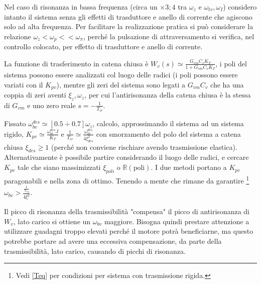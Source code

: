 Nel caso di risonanza in bassa frequenza (circa un \(\times 3;4\) tra \(\omega_z\) e \(\omega_{tv}, \omega_I\)) considero intanto il sistema senza gli effetti di trasduttore e anello di corrente che agiscono solo ad alta frequenza.
Per facilitare la realizzazione pratica si può considerare la relazione \(\omega_z < \omega_p << \omega_\pi\), perché la pulsazione di attraversamento si verifica, nel controllo colocato, per effetto di trasduttore e anello di corrente.

La funzione di trasferimento in catena chiusa è \(W_v(s) \simeq \frac{G_{vm}C_v K_T}{1+G_{vm}C_v K_T}\), i poli del sistema possono essere analizzati col luogo delle radici (i poli possono essere variati con il \(K_{pv}\)), mentre gli zeri del sistema sono legati a \(G_{vm}C_v\) che ha una coppia di zeri aventi \(\xi_z, \omega_z\), per cui l'antirisonanza della catena chiusa è la stessa di \(G_{vm}\) e uno zero reale \(s=-\frac{1}{T_{iv}}\).


Fissato \(\omega_{bv}^{des} \simeq [0.5\div 0.7]\omega_z\), calcolo, approssimando il sistema ad un sistema rigido, \(K_{pv} \simeq \frac{\omega_{bv}^{des} J}{K_T}\) e \(\frac{1}{T_{iv}} \simeq \frac{\omega_{bv}^{des}}{4 \xi_{des}^2}\) con smorzamento del polo del sistema a catena chiusa \(\xi_{des} \geqslant 1\) (perché non conviene rischiare avendo trasmissione elastica).
Alternativamente è possibile partire considerando il luogo delle radici, e cercare \(K_{pv}\) tale che siano massimizzati \(\xi_{poli}\) o \(\mathbb{R}(\text{poli})\).
I due metodi portano a \(K_{pv}\) paragonabili e nella zona di ottimo.
Tenendo a mente che rimane da garantire \footnote{Vedi \ref{Teq} per condizioni per sistema con trasmissione rigida.} \(\omega_{bv} > \frac{\frac{1}{T_{eq}}}{4\xi^2}\).

Il picco di risonanza della trasmissibilità "compensa" il picco di antirisonanza di \(W_v\), lato carico si ottiene un \(\omega_{bv}\) maggiore.
Bisogna quindi prestare attenzione a utilizzare guadagni troppo elevati perché il motore potrà beneficiarne, ma questo potrebbe portare ad avere una eccessiva compensazione, da parte della trasmissibilità, lato carico, causando di picchi di risonanza.


